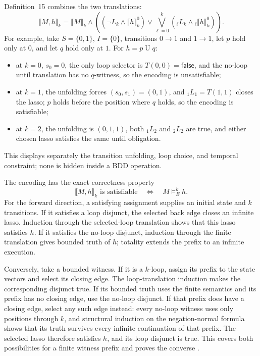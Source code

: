 Definition~15 combines the two translations:
\[
 \llbracket M,h\rrbracket_k
 =\llbracket M\rrbracket_k\land
 \left(
   (\neg L_k\land\llbracket h\rrbracket^0_k)
   \lor
   \bigvee_{\ell=0}^{k}
    ({}_\ell L_k\land{}_\ell\llbracket h\rrbracket^0_k)
 \right).
\]
For example, take \(S=\{0,1\}\), \(I=\{0\}\), transitions
\(0\to1\) and \(1\to1\), let \(p\) hold only at \(0\), and let \(q\) hold
only at \(1\).  For \(h=p\mathbin{U}q\):
\begin{itemize}
\item at \(k=0\), \(s_0=0\), the only loop selector is
  \(T(0,0)=\mathsf{false}\), and the no-loop until translation has no
  \(q\)-witness, so the encoding is unsatisfiable;
\item at \(k=1\), the unfolding forces \((s_0,s_1)=(0,1)\), and
  \({}_1L_1=T(1,1)\) closes the lasso; \(p\) holds before the position where
  \(q\) holds, so the encoding is satisfiable;
\item at \(k=2\), the unfolding is \((0,1,1)\), both
  \({}_1L_2\) and \({}_2L_2\) are true, and either chosen lasso satisfies the
  same until obligation.
\end{itemize}
This displays separately the transition unfolding, loop choice, and temporal
constraint; none is hidden inside a BDD operation.

The encoding has the exact correctness property
\[
 \llbracket M,h\rrbracket_k\text{ is satisfiable}
 \quad\Longleftrightarrow\quad M\models_E^k h.
\]
For the forward direction, a satisfying assignment supplies an initial state
and \(k\) transitions. If it satisfies a loop disjunct, the selected back edge
closes an infinite lasso. Induction through the selected-loop translation
shows that this lasso satisfies \(h\). If it satisfies the no-loop disjunct,
induction through the finite translation gives bounded truth of \(h\);
totality extends the prefix to an infinite execution.

Conversely, take a bounded witness. If it is a \(k\)-loop, assign its prefix
to the state vectors and select its closing edge. The loop-translation
induction makes the corresponding disjunct true. If its bounded truth uses
the finite semantics and its prefix has no closing edge, use the no-loop
disjunct. If that prefix does have a closing edge, select any such edge
instead: every no-loop witness uses only positions through \(k\), and
structural induction on the negation-normal formula shows that its truth
survives every infinite continuation of that prefix. The selected lasso
therefore satisfies \(h\), and its loop disjunct is true. This covers both
possibilities for a finite witness prefix and proves the converse
\cite[thm.~16]{BiereCimattiClarkeZhu1999}.

